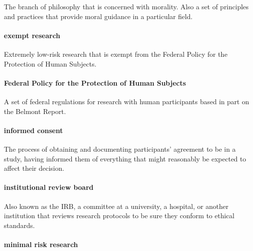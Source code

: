 \documentclass[
]{krantz}
\begin{document}
The branch of philosophy that is concerned with morality. Also a set of principles and practices that provide moral guidance in a particular field.

\hypertarget{exempt-research}{%
\paragraph*{exempt research}\label{exempt-research}}

Extremely low-risk research that is exempt from the Federal Policy for the Protection of Human Subjects.

\hypertarget{federal-policy-for-the-protection-of-human-subjects}{%
\paragraph*{Federal Policy for the Protection of Human Subjects}\label{federal-policy-for-the-protection-of-human-subjects}}

A set of federal regulations for research with human participants based in part on the Belmont Report.

\hypertarget{informed-consent-1}{%
\paragraph*{informed consent}\label{informed-consent-1}}

The process of obtaining and documenting participants' agreement to be in a study, having informed them of everything that might reasonably be expected to affect their decision.

\hypertarget{institutional-review-board}{%
\paragraph*{institutional review board}\label{institutional-review-board}}

Also known as the IRB, a committee at a university, a hospital, or another institution that reviews research protocols to be sure they conform to ethical standards.

\hypertarget{minimal-risk-research}{%
\paragraph*{minimal risk research}\label{minimal-risk-research}}
\end{document}
